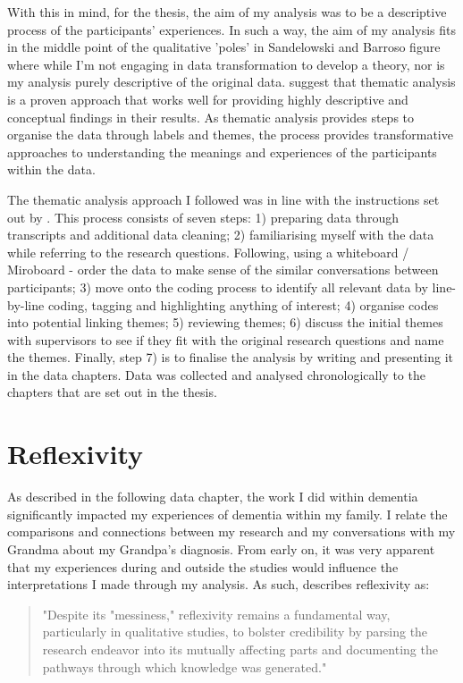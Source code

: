 With this in mind, for the thesis, the aim of my analysis was to be a descriptive process of the participants' experiences. In such a way, the aim of my analysis fits in the middle point of the qualitative 'poles' in Sandelowski and Barroso figure where while I'm not engaging in data transformation to develop a theory, nor is my analysis purely descriptive of the original data. \citep{kiger2020thematic} suggest that thematic analysis is a proven approach that works well for providing highly descriptive and conceptual findings in their results. As thematic analysis provides steps to organise the data through labels and themes, the process provides transformative approaches to understanding the meanings and experiences of the participants within the data. 

The thematic analysis approach I followed was in line with the instructions set out by \cite{braun_one_2020}. This process consists of seven steps: 1) preparing data through transcripts and additional data cleaning; 2) familiarising myself with the data while referring to the research questions. Following, using a whiteboard / Miroboard - order the data to make sense of the similar conversations between participants; 3) move onto the coding process to identify all relevant data by line-by-line coding, tagging and highlighting anything of interest; 4) organise codes into potential linking themes; 5) reviewing themes; 6) discuss the initial themes with supervisors to see if they fit with the original research questions and name the themes. Finally, step 7) is to finalise the analysis by writing and presenting it in the data chapters. Data was collected and analysed chronologically to the chapters that are set out in the thesis.

\section{Reflexivity}
\label{Method:Reflectivity}
 As described in the following data chapter, the work I did within dementia significantly impacted my experiences of dementia within my family. I relate the comparisons and connections between my research and my conversations with my Grandma about my Grandpa's diagnosis. From early on, it was very apparent that my experiences during and outside the studies would influence the interpretations I made through my analysis. As such, \cite{probst2015eye} describes reflexivity as:
\begin{quote}
"Despite its "messiness," reflexivity remains a fundamental way, particularly in qualitative studies, to bolster credibility by parsing the research endeavor into its mutually affecting parts and documenting the pathways through which knowledge was generated." \citep{probst2015eye}
\end{quote}

